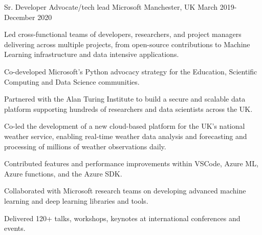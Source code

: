 \begin{cventries}
\cventry
{Sr. Developer Advocate/tech lead} %
{Microsoft} %
{Manchester, UK} %
{March 2019-December 2020 } %
{ %
\begin{cvitems}
\item {Led cross-functional teams of developers, researchers, and project managers delivering across multiple projects, from open-source contributions to Machine Learning infrastructure and data intensive applications.}
\item {Co-developed Microsoft's Python advocacy strategy for the Education, Scientific Computing and Data Science communities.}
\item {Partnered with the Alan Turing Institute to build a secure and scalable data platform supporting hundreds of researchers and data scientists across the UK.}
\item{Co-led the development of a new cloud-based platform for the UK's national weather service, enabling real-time weather data analysis and forecasting and processing of millions of weather observations daily.}
\item {Contributed features and performance improvements within VSCode, Azure ML, Azure functions, and the Azure SDK.}
\item {Collaborated with Microsoft research teams on developing advanced machine learning and deep learning libraries and tools.}
\item {Delivered 120+ talks, workshops, keynotes at international conferences and events.}
\end{cvitems}
}



\end{cventries}
